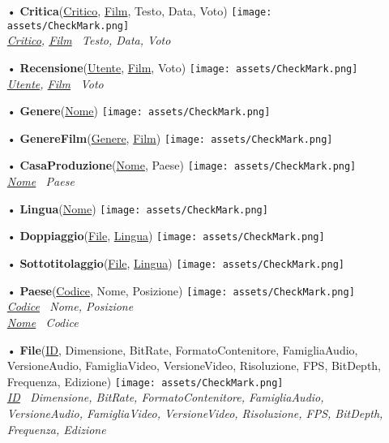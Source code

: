 \documentclass{article}
\begin{document}
\begin{itemize}
    \item[•] \textbf{Critica}(\underline{Critico}, \underline{Film}, Testo, Data, Voto) \texttt{[image: assets/CheckMark.png]} \\ 
    {\small \textit{\underline{Critico}, \underline{Film} \textrightarrow\, Testo, Data, Voto}} 
    
    \item[•] \textbf{Recensione}(\underline{Utente}, \underline{Film}, Voto) \texttt{[image: assets/CheckMark.png]} \\ 
    {\small \textit{\underline{Utente}, \underline{Film} \textrightarrow\, Voto}} 
    
    \item[•] \textbf{Genere}(\underline{Nome}) \texttt{[image: assets/CheckMark.png]}
    
    \item[•] \textbf{GenereFilm}(\underline{Genere}, \underline{Film}) \texttt{[image: assets/CheckMark.png]}
    
    \item[•] \textbf{CasaProduzione}(\underline{Nome}, Paese) \texttt{[image: assets/CheckMark.png]} \\
    {\small \textit{\underline{Nome} \textrightarrow\, Paese}} 

    \item[•]  \textbf{Lingua}(\underline{Nome}) \texttt{[image: assets/CheckMark.png]}

    \item[•] \textbf{Doppiaggio}(\underline{File}, \underline{Lingua}) \texttt{[image: assets/CheckMark.png]}

    \item[•] \textbf{Sottotitolaggio}(\underline{File}, \underline{Lingua}) \texttt{[image: assets/CheckMark.png]}

    \item[•] \textbf{Paese}(\underline{Codice}, Nome, Posizione) \texttt{[image: assets/CheckMark.png]} \\
    {\small \textit{\underline{Codice} \textrightarrow\, Nome, Posizione}} \\
    {\small \textit{\underline{Nome} \textrightarrow\, Codice}} 

    \item[•] \textbf{File}(\underline{ID}, Dimensione, BitRate, FormatoContenitore, FamigliaAudio, VersioneAudio, FamigliaVideo, VersioneVideo, Risoluzione, FPS, BitDepth, Frequenza, Edizione) \texttt{[image: assets/CheckMark.png]} \\ 
    {\small \textit{\underline{ID} \textrightarrow\, Dimensione, BitRate, FormatoContenitore, FamigliaAudio, VersioneAudio, FamigliaVideo, VersioneVideo, Risoluzione, FPS, BitDepth, Frequenza, Edizione}}


\end{itemize}
\end{document}
